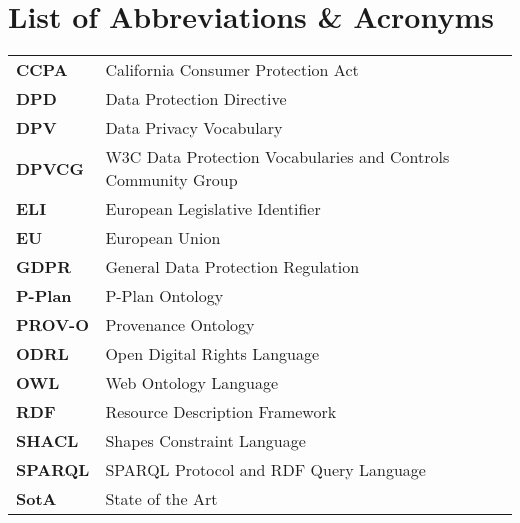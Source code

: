 \pagestyle{empty}
\chapter*{List of Abbreviations \& Acronyms}
\begin{table}[htbp]
    \centering
    \begin{tabular}{>{\bfseries}l|l}
        CCPA & California Consumer Protection Act \\
        DPD & Data Protection Directive \\
        DPV & Data Privacy Vocabulary \\
        DPVCG & W3C Data Protection Vocabularies and Controls Community Group \\
        ELI & European Legislative Identifier \\
        EU & European Union \\
        GDPR & General Data Protection Regulation \\
        P-Plan & P-Plan Ontology \\
        PROV-O & Provenance Ontology \\
        ODRL & Open Digital Rights Language \\ 
        OWL & Web Ontology Language \\
        RDF & Resource Description Framework \\
        SHACL & Shapes Constraint Language \\
        SPARQL & SPARQL Protocol and RDF Query Language \\
        SotA & State of the Art \\
    \end{tabular}
\end{table}